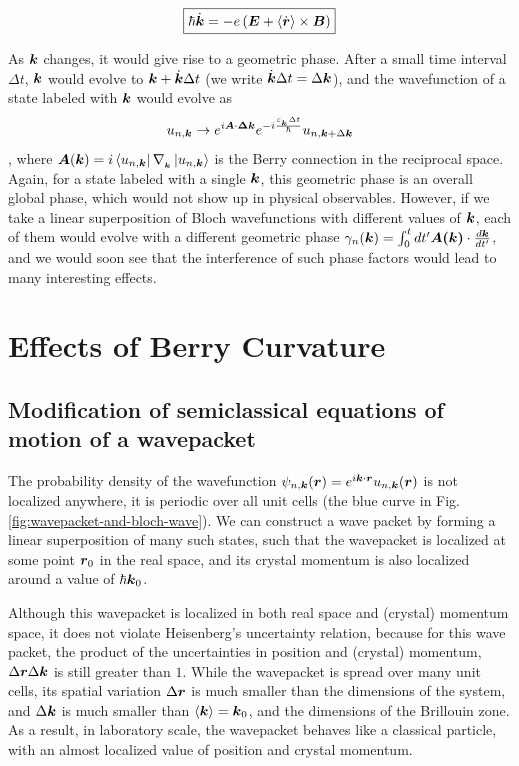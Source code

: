 \documentclass{revtex4-2}
\renewcommand\vec[1]{\ensuremath\boldsymbol{#1}} %
\begin{document}
\begin{equation} \label{Eq:evolution-of-k}
	\boxed{\hbar \dot{\vec{k}} = -e\left(\vec{E} + \langle\dot{\vec{r}}\rangle \times \vec{B} \right)}
\end{equation}

As $\vec{k}$ changes, it would give rise to a geometric phase. After a small time interval $\Delta t$, $\vec{k}$ would evolve to $\vec{k} + \dot{\vec{k}} \Delta t$ (we write $\dot{\vec{k}} \Delta t = \Delta \vec{k} $), and the wavefunction of a state labeled with $\vec{k}$ would evolve as 
\begin{equation}\label{Eq:u-n-k-time-evolution}
	u_{n, \vec{k}} \rightarrow e^{i \vec{A}\cdot \vec{\Delta{k}}} e^{-i \frac{\varepsilon_{_{\vec{k}}} \Delta t}{\hbar}} u_{n, \vec{k}+\Delta \vec{k}}
\end{equation}, where $\vec{A}(\vec{k})=i \bra{u_{n,\vec{k}}}\nabla_{_{\vec{k}}} \ket{u_{n,\vec{k}}}$ is the Berry connection in the reciprocal space. Again, for a state labeled with a single $\vec{k}$, this geometric phase is an overall global phase, which would not show up in physical observables. However, if we take a linear superposition of Bloch wavefunctions with different values of $\vec{k}$, each of them would evolve with a different geometric phase $\gamma_n (\vec{k}) = \int_{0}^{t} dt' \vec{A(\vec{k})} \cdot \frac{d \vec{k}}{dt'} $, and we would soon see that the interference of such phase factors would lead to many interesting effects.
\section{Effects of Berry Curvature}
\subsection{Modification of semiclassical equations of motion of a wavepacket}
The probability density of the wavefunction $\psi_{n, \vec{k}} (\vec{r}) = e^{i \vec{k}\cdot \vec{r}} u_{n,\vec{k}} (\vec{r})$ is not localized anywhere, it is periodic over all unit cells (the blue curve in Fig. \ref{fig:wavepacket-and-bloch-wave}). We can construct a wave packet by forming a linear superposition of many such states, such that the wavepacket is localized at some point $\vec{r}_0$ in the real space, and its crystal momentum is also localized around a value of $\hbar \vec{k}_0$.

Although this wavepacket is localized in both real space and (crystal) momentum space, it does not violate Heisenberg's uncertainty relation, because for this wave packet, the product of the uncertainties in position and (crystal) momentum, $\Delta \vec{r} \Delta \vec{k}$ is still greater than $1$. While the wavepacket is spread over many unit cells, its spatial variation $\Delta \vec{r}$ is much smaller than the dimensions of the system, and $\Delta \vec{k}$ is much smaller than $\langle \vec{k} \rangle = \vec{k}_0$, and the dimensions of the Brillouin zone. As a result, in laboratory scale, the wavepacket behaves like a classical particle, with an almost localized value of position and crystal momentum.
\end{document}

